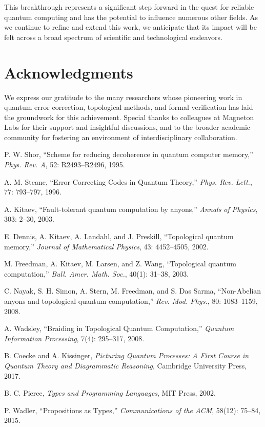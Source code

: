\documentclass[12pt]{article}
\begin{document}
This breakthrough represents a significant step forward in the quest for reliable quantum computing and has the potential to influence numerous other fields. As we continue to refine and extend this work, we anticipate that its impact will be felt across a broad spectrum of scientific and technological endeavors.

\section*{Acknowledgments}
We express our gratitude to the many researchers whose pioneering work in quantum error correction, topological methods, and formal verification has laid the groundwork for this achievement. Special thanks to colleagues at Magneton Labs for their support and insightful discussions, and to the broader academic community for fostering an environment of interdisciplinary collaboration.

\begin{thebibliography}{99}

P. W. Shor, 
\newblock ``Scheme for reducing decoherence in quantum computer memory,''
\newblock \emph{Phys. Rev. A}, 52: R2493--R2496, 1995.

A. M. Steane,
\newblock ``Error Correcting Codes in Quantum Theory,''
\newblock \emph{Phys. Rev. Lett.}, 77: 793--797, 1996.

A. Kitaev,
\newblock ``Fault-tolerant quantum computation by anyons,''
\newblock \emph{Annals of Physics}, 303: 2--30, 2003.

E. Dennis, A. Kitaev, A. Landahl, and J. Preskill,
\newblock ``Topological quantum memory,''
\newblock \emph{Journal of Mathematical Physics}, 43: 4452--4505, 2002.

M. Freedman, A. Kitaev, M. Larsen, and Z. Wang,
\newblock ``Topological quantum computation,''
\newblock \emph{Bull. Amer. Math. Soc.}, 40(1): 31--38, 2003.

C. Nayak, S. H. Simon, A. Stern, M. Freedman, and S. Das Sarma,
\newblock ``Non-Abelian anyons and topological quantum computation,''
\newblock \emph{Rev. Mod. Phys.}, 80: 1083--1159, 2008.

A. Wadsley,
\newblock ``Braiding in Topological Quantum Computation,''
\newblock \emph{Quantum Information Processing}, 7(4): 295--317, 2008.

B. Coecke and A. Kissinger,
\newblock \emph{Picturing Quantum Processes: A First Course in Quantum Theory and Diagrammatic Reasoning},
\newblock Cambridge University Press, 2017.

B. C. Pierce,
\newblock \emph{Types and Programming Languages},
\newblock MIT Press, 2002.

P. Wadler,
\newblock ``Propositions as Types,''
\newblock \emph{Communications of the ACM}, 58(12): 75--84, 2015.

\end{thebibliography}
\end{document}
